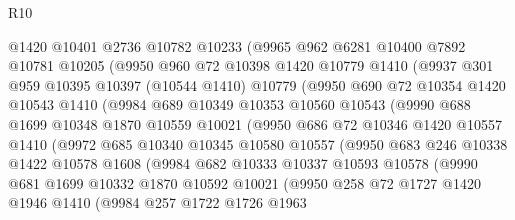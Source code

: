 \begin{lexlean}{R10}
\begin{coremodule}
          @1420
          @10401
          @2736
          @10782
          @10233
          (@9965
            @962
            @6281
            @10400
            @7892
            @10781
            @10205
            (@9950
              @960
              @72
              @10398
              @1420
              @10779
              @1410
              (@9937
                @301
                @959
                @10395
                @10397
                (@10544 @1410)
                @10779
                (@9950
                  @690
                  @72
                  @10354
                  @1420
                  @10543
                  @1410
                  (@9984
                    @689
                    @10349
                    @10353
                    @10560
                    @10543
                    (@9990
                      @688
                      @1699
                      @10348
                      @1870
                      @10559
                      @10021
                      (@9950
                        @686
                        @72
                        @10346
                        @1420
                        @10557
                        @1410
                        (@9972
                          @685
                          @10340
                          @10345
                          @10580
                          @10557
                          (@9950
                            @683
                            @246
                            @10338
                            @1422
                            @10578
                            @1608
                            (@9984
                              @682
                              @10333
                              @10337
                              @10593
                              @10578
                              (@9990
                                @681
                                @1699
                                @10332
                                @1870
                                @10592
                                @10021
                                (@9950
                                  @258
                                  @72
                                  @1727
                                  @1420
                                  @1946
                                  @1410
                                  (@9984
                                    @257
                                    @1722
                                    @1726
                                    @1963

\end{coremodule}
\end{lexlean}

